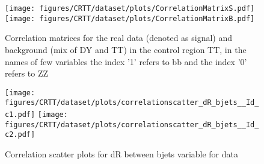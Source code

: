 \begin{figure}[!htb]%
\centering
\texttt{[image: figures/CRTT/dataset/plots/CorrelationMatrixS.pdf]}
\bigbreak
\texttt{[image: figures/CRTT/dataset/plots/CorrelationMatrixB.pdf]}
\caption{ Correlation matrices for the real data (denoted as signal) and background (mix of DY and TT) in the control region TT, in the names of few variables the index '1' refers to bb and the index '0' refers to ZZ}
\label{fig:corrMatrix_CRTT}                                                       
\end{figure}\clearpage





\begin{figure}[!htb]%
\centering
\texttt{[image: figures/CRTT/dataset/plots/correlationscatter\_dR\_bjets\_\_Id\_c1.pdf]}
\texttt{[image: figures/CRTT/dataset/plots/correlationscatter\_dR\_bjets\_\_Id\_c2.pdf]}
\caption{ Correlation scatter plots for dR between bjets variable for data}%
\label{fig:correlations_CRTT_drbjets_S}                                                       
\end{figure}\clearpage



